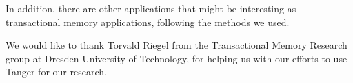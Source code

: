 \documentclass[preprint,11pt]{sigplanconf}
\begin{document}
In addition, there are other applications that might be interesting as
transactional memory applications, following the methods we used.



\acks

We would like to thank Torvald Riegel from the Transactional Memory Research
group at Dresden University of Technology, for helping us with our efforts to
use {\sc Tanger} for our research.



%
%


\end{document}
